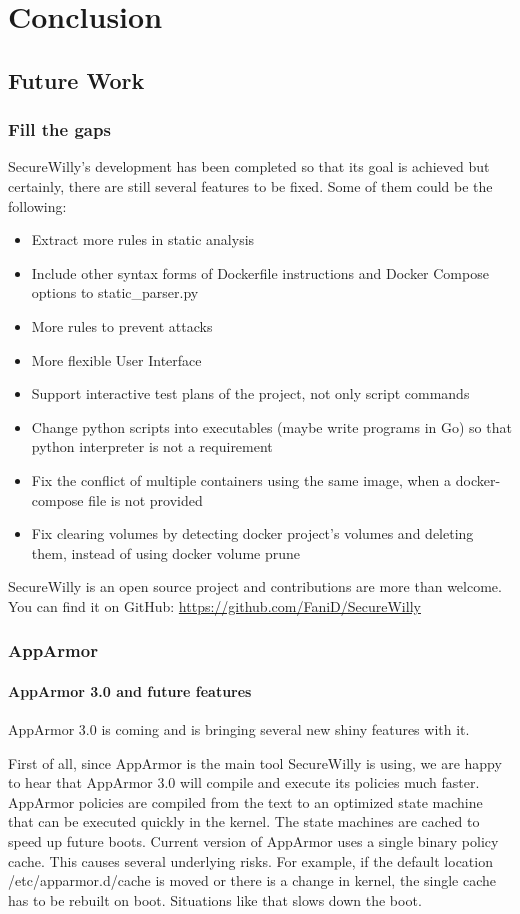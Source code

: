 \chapter{Conclusion}
\section{Future Work}

\subsection{Fill the gaps}
SecureWilly's development has been completed so that its goal is achieved but certainly, there are still several features to be fixed. Some of them could be the following:
\begin{itemize}
\item Extract more rules in static analysis
\item Include other syntax forms of Dockerfile instructions and Docker Compose options to static\_parser.py
\item More rules to prevent attacks
\item More flexible User Interface
\item Support interactive test plans of the project, not only script commands
\item Change python scripts into executables (maybe write programs in Go) so that python interpreter is not a requirement
\item Fix the conflict of multiple containers using the same image, when a docker-compose file is not provided
\item Fix clearing volumes by detecting docker project's volumes and deleting them, instead of using docker volume prune
\end{itemize}
SecureWilly is an open source project and contributions are more than welcome. You can find it on GitHub: \url{https://github.com/FaniD/SecureWilly}

\subsection{AppArmor}
\subsubsection{AppArmor 3.0 and future features}
AppArmor 3.0 is coming and is bringing several new shiny features with it. \cite{app3seth}

First of all, since AppArmor is the main tool SecureWilly is using, we are happy to hear that AppArmor 3.0 will compile and execute its policies much faster. AppArmor policies are compiled from the text to an optimized state machine that can be executed quickly in the kernel. The state machines are cached to speed up future boots. Current version of AppArmor uses a single binary policy cache. This causes several underlying risks. For example, if the default location /etc/apparmor.d/cache is moved or there is a change in kernel, the single cache has to be rebuilt on boot. Situations like that slows down the boot.
  
